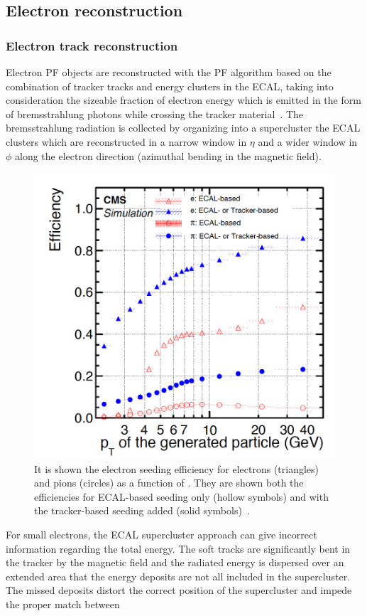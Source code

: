 \subsection{Electron reconstruction}\label{sec:c2ele}

\subsubsection{Electron track reconstruction}\label{sec:trackele}

Electron PF objects are reconstructed with the PF algorithm 
based on the combination of tracker tracks and energy clusters in the 
ECAL, taking into consideration the sizeable fraction
of electron energy which is emitted in the form of bremsstrahlung photons while
crossing the tracker material~\cite{CMS:particleflow}. The bremsstrahlung radiation is collected
by organizing into a supercluster the ECAL clusters which are
reconstructed in a narrow window in $\eta$ and a wider window in $\phi$ along the electron direction (azimuthal
bending in the magnetic field).
\begin{figure}
\centering
\includegraphics[width=.48\textwidth]{Figures/c2/eleecal}
  \caption{It is shown the electron seeding efficiency for electrons (triangles) and pions (circles) as a
function of \pt. They are shown both the efficiencies for ECAL-based
seeding only (hollow symbols) and with the tracker-based seeding added
(solid symbols)~\cite{CMS:particleflow}.}
  \label{fig:c2ele}
\end{figure} 
For small \pt electrons, the ECAL supercluster approach can give
incorrect information regarding the total energy. The soft tracks are
significantly bent in the tracker by the magnetic field and the
radiated energy is dispersed over an extended area that the energy
deposits are not all
included in the supercluster. The missed deposits distort the correct
position of the supercluster and impede the proper match between
